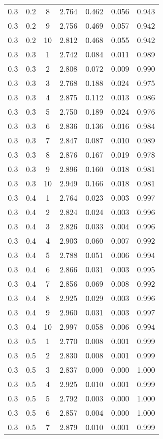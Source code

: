 \begin{tabular}{|c|c|c|c|c|c|c|}
0.3 & 0.2 & 8 & 2.764 & 0.462 & 0.056 & 0.943 \\
0.3 & 0.2 & 9 & 2.756 & 0.469 & 0.057 & 0.942 \\
0.3 & 0.2 & 10 & 2.812 & 0.468 & 0.055 & 0.942 \\
0.3 & 0.3 & 1 & 2.742 & 0.084 & 0.011 & 0.989 \\
0.3 & 0.3 & 2 & 2.808 & 0.072 & 0.009 & 0.990 \\
0.3 & 0.3 & 3 & 2.768 & 0.188 & 0.024 & 0.975 \\
0.3 & 0.3 & 4 & 2.875 & 0.112 & 0.013 & 0.986 \\
0.3 & 0.3 & 5 & 2.750 & 0.189 & 0.024 & 0.976 \\
0.3 & 0.3 & 6 & 2.836 & 0.136 & 0.016 & 0.984 \\
0.3 & 0.3 & 7 & 2.847 & 0.087 & 0.010 & 0.989 \\
0.3 & 0.3 & 8 & 2.876 & 0.167 & 0.019 & 0.978 \\
0.3 & 0.3 & 9 & 2.896 & 0.160 & 0.018 & 0.981 \\
0.3 & 0.3 & 10 & 2.949 & 0.166 & 0.018 & 0.981 \\
0.3 & 0.4 & 1 & 2.764 & 0.023 & 0.003 & 0.997 \\
0.3 & 0.4 & 2 & 2.824 & 0.024 & 0.003 & 0.996 \\
0.3 & 0.4 & 3 & 2.826 & 0.033 & 0.004 & 0.996 \\
0.3 & 0.4 & 4 & 2.903 & 0.060 & 0.007 & 0.992 \\
0.3 & 0.4 & 5 & 2.788 & 0.051 & 0.006 & 0.994 \\
0.3 & 0.4 & 6 & 2.866 & 0.031 & 0.003 & 0.995 \\
0.3 & 0.4 & 7 & 2.856 & 0.069 & 0.008 & 0.992 \\
0.3 & 0.4 & 8 & 2.925 & 0.029 & 0.003 & 0.996 \\
0.3 & 0.4 & 9 & 2.960 & 0.031 & 0.003 & 0.997 \\
0.3 & 0.4 & 10 & 2.997 & 0.058 & 0.006 & 0.994 \\
0.3 & 0.5 & 1 & 2.770 & 0.008 & 0.001 & 0.999 \\
0.3 & 0.5 & 2 & 2.830 & 0.008 & 0.001 & 0.999 \\
0.3 & 0.5 & 3 & 2.837 & 0.000 & 0.000 & 1.000 \\
0.3 & 0.5 & 4 & 2.925 & 0.010 & 0.001 & 0.999 \\
0.3 & 0.5 & 5 & 2.792 & 0.003 & 0.000 & 1.000 \\
0.3 & 0.5 & 6 & 2.857 & 0.004 & 0.000 & 1.000 \\
0.3 & 0.5 & 7 & 2.879 & 0.010 & 0.001 & 0.999 \\

\end{tabular}
